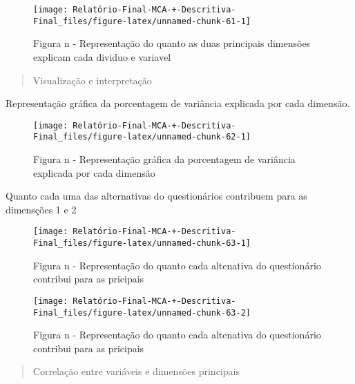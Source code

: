 \documentclass[
]{article}
\begin{document}
\begin{figure}

{\centering \texttt{[image: Relatório-Final-MCA-+-Descritiva-Final\_files/figure-latex/unnamed-chunk-61-1]} 

}

\caption{Figura n - Representação do quanto as duas principais dimensões explicam cada dividuo e variavel}\label{fig:unnamed-chunk-61}
\end{figure}

\begin{quote}
Visualização e interpretação
\end{quote}

Representação gráfica da porcentagem de variância explicada por cada
dimensão.

\begin{figure}

{\centering \texttt{[image: Relatório-Final-MCA-+-Descritiva-Final\_files/figure-latex/unnamed-chunk-62-1]} 

}

\caption{Figura n - Representação gráfica da porcentagem de variância explicada por cada dimensão}\label{fig:unnamed-chunk-62}
\end{figure}

Quanto cada uma das alternativas do questionários contribuem para as
dimensções 1 e 2

\begin{figure}

{\centering \texttt{[image: Relatório-Final-MCA-+-Descritiva-Final\_files/figure-latex/unnamed-chunk-63-1]} 

}

\caption{Figura n - Representação do quanto cada altenativa do questionário contribui para as pricipais}\label{fig:unnamed-chunk-63-1}
\end{figure}
\begin{figure}

{\centering \texttt{[image: Relatório-Final-MCA-+-Descritiva-Final\_files/figure-latex/unnamed-chunk-63-2]} 

}

\caption{Figura n - Representação do quanto cada altenativa do questionário contribui para as pricipais}\label{fig:unnamed-chunk-63-2}
\end{figure}

\begin{quote}
Correlação entre variáveis e dimensões principais
\end{quote}
\end{document}
